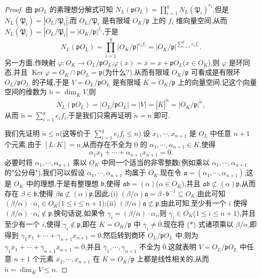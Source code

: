 \begin{proof}
由 $\mathfrak{p}O_L$ 的素理想分解式可知 $N_L(\mathfrak{p}O_L)=\prod_{i=1}^{g}N_L(\mathfrak{P}_i)^{e_i}$,但是 $N_L(\mathfrak{P}_i)=|O_L/\mathfrak{P}_i|$,而 $O_L/\mathfrak{P}_i$ 是有限域 $O_K/\mathfrak{p}$ 上的 $f_i$ 维向量空间,从而 $N_L(\mathfrak{P}_i)=|O_L/\mathfrak{P}_i|=|O_K/\mathfrak{p}|^{f_i}$,于是
\[
  N_L(\mathfrak{p}O_L)=\prod_{i=1}^{g}|O_K/\mathfrak{p}|^{e_if_i}=|O_K/\mathfrak{p}|^{\sum_{i=1}^{g}e_if_i}.
\]
另一方面,作映射 $\varphi\colon O_K\to O_L/\mathfrak{p}O_L$,$\varphi(x)=\bar{x}=x+\mathfrak{p}O_L$($x\in O_K$),则 $\varphi$ 是环同态,并且 $\operatorname{Ker}\varphi=O_K\cap\mathfrak{p}O_L=\mathfrak{p}$(为什么?).从而有限域 $O_K/\mathfrak{p}$ 可看成是有限环 $O_L/\mathfrak{p}O_L$ 的子域,于是 $V=O_L/\mathfrak{p}O_L$ 是有限域 $\overline{K}=O_K/\mathfrak{p}$ 上的向量空间.记这个向量空间的维数为 $\widetilde{n}=\dim_{\overline{K}}V$,则
\[
  N_L(\mathfrak{p}O_L)=|O_L/\mathfrak{p}O_L|=|V|=|\overline{K}|^{\widetilde{n}}=|O_K/\mathfrak{p}|^{\widetilde{n}},
\]
从而 $\widetilde{n}=\sum_{i=1}^{g}e_if_i$,于是我们只需再证明 $\widetilde{n}=n$ 即可.

我们先证明 $\widetilde{n}\leqslant n$(这等价于 $\sum_{i=1}^{g}e_if_i\leqslant n$).设 $x_1,\cdots,x_{n+1}$ 是 $O_L$ 中任意 $n+1$ 个元素,由于 $[L:K]=n$,从而存在不全为 $0$ 的 $\alpha_1,\cdots,\alpha_{n+1}\in K$,使得
\begin{equation}  \alpha_1x_1+\cdots+\alpha_{n+1}x_{n+1}=0.\tag{*}\end{equation}
必要时将 $\alpha_1,\cdots,\alpha_{n+1}$ 乘以 $O_K$ 中同一个适当的非零整数(例如乘以 $\alpha_1,\cdots,\alpha_{n+1}$ 的"公分母"),我们可以假设 $\alpha_1,\cdots,\alpha_{n+1}$ 均属于 $O_K$.现在令 $\mathfrak{a}=(\alpha_1,\cdots,\alpha_{n+1})$,这是 $O_K$ 中的理想,于是有整理想 $\mathfrak{b}$,使得 $\mathfrak{ab}=(\alpha)$($\alpha\in O_K$),并且 $\mathfrak{ab}\not\subset(\alpha)\mathfrak{p}$,从而存在 $\beta\in\mathfrak{b}$,使得 $\beta\mathfrak{a}\not\subset(\alpha)\mathfrak{p}$.因此:(i) $(\beta/\alpha)\mathfrak{a}=\beta\cdot\mathfrak{b}^{-1}\subseteq O_K$,由此可知 $(\beta/\alpha)\cdot\alpha_i\in O_K$($1\leqslant i\leqslant n+1$);(ii) $(\beta/\alpha)\mathfrak{a}\not\subset\mathfrak{p}$.由此可知,至少有一个 $i$ 使得 $(\beta/\alpha)\cdot\alpha_i\notin\mathfrak{p}$.换句话说,如果令 $\gamma_i=(\beta/\alpha)\cdot\alpha_i$,则 $\gamma_i\in O_K$($1\leqslant i\leqslant n+1$),并且至少有一个 $i$,使得 $\gamma_i\notin\mathfrak{p}$,即在 $\overline{K}=O_K/\mathfrak{p}$ 中 $\overline{\gamma}_i\neq\overline{0}$.现在将 (*) 式诸项乘以 $\beta/\alpha$,即得到 $\gamma_1x_1+\cdots+\gamma_{n+1}x_{n+1}=0$.然后转到商环 $O_L/\mathfrak{p}O_L$ 中,则为 $\overline{\gamma}_1\overline{x}_1+\cdots+\overline{\gamma}_{n+1}\overline{x}_{n+1}=\overline{0}$,并且 $\overline{\gamma}_1,\cdots,\overline{\gamma}_{n+1}$ 不全为 $\overline{0}$.这就表明 $V=O_L/\mathfrak{p}O_L$ 中任意 $n+1$ 个元素 $\overline{x}_1,\cdots,\overline{x}_{n+1}$ 在 $\overline{K}=O_K/\mathfrak{p}$ 上都是线性相关的,从而 $\widetilde{n}=\dim_{\overline{K}}V\leqslant n$.


\end{proof}
